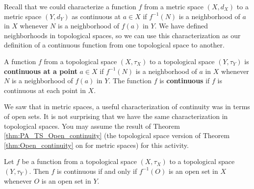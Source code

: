 \label{sec:continuity_topology}


\vspace*{-17 pt}

\vspace*{13 pt}


Recall that we could characterize a function $f$ from a metric space $(X,d_X)$ to a metric space $(Y,d_Y)$ as continuous at $a \in X$ if $f^{-1}(N)$ is a neighborhood of $a$ in $X$ whenever $N$ is a neighborhood of $f(a)$ in $Y$. We have defined neighborhoods in topological spaces, so we can use this characterization as our definition of a continuous function from one topological space to another. 

\begin{definition} \label{def:Continuity_topology} A function $f$ from a topological space $(X, \tau_X)$ to a topological space $(Y, \tau_Y)$ is \textbf{continuous at a point} $a \in X$ if $f^{-1}(N)$ is a neighborhood of $a$ in $X$ whenever $N$ is a neighborhood of $f(a)$ in $Y$. The function $f$ is \textbf{continuous} if $f$ is continuous at each point in $X$.
\end{definition}

We saw that in metric spaces, a useful characterization of continuity was in terms of open sets. It is not surprising that we have the same characterization in topological spaces. You may assume the result of Theorem \ref{thm:PA_TS_Open_continuity} (the topological space version of Theorem \ref{thm:Open_continuity} on \pageref{thm:Open_continuity} for metric spaces) for this activity. 

\begin{theorem} \label{thm:PA_TS_Open_continuity} Let $f$ be a function from a topological space $(X,\tau_X)$ to a topological space $(Y,\tau_Y)$. Then $f$ is continuous if and only if $f^{-1}(O)$ is an open set in $X$ whenever $O$ is an open set in $Y$.  
\end{theorem}

